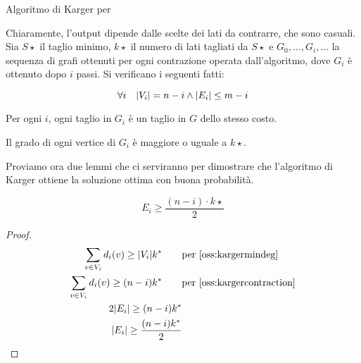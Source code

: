 \begin{algorithm}[ht]
	\caption{Algoritmo di Karger per \MinCut}
	\label{algo:Karger}

\end{algorithm}

Chiaramente, l'output dipende dalle scelte dei lati da contrarre, che sono casuali.
Sia $S\star$ il taglio minimo, $k\star$ il numero di lati tagliati da $S\star$ e $G_0,\dots,G_i,\dots$ la sequenza di grafi ottenuti per ogni contrazione operata dall'algoritmo, dove $G_i$ è ottenuto dopo $i$ passi. Si verificano i seguenti fatti:
\begin{oss}\label{oss:kargercontraction}
	\begin{equation*}
		\forall i \quad | V_i | = n-i \land | E_i | \leq m-i
	\end{equation*}
\end{oss}
\begin{oss}\label{oss:kargercuts}
	Per ogni $i$, ogni taglio in $G_i$ è un taglio in $G$ dello stesso costo.
\end{oss}
\begin{oss}\label{oss:kargermindeg}
	Il grado di ogni vertice di $G_i$ è maggiore o uguale a $k\star$.
\end{oss}

Proviamo ora due lemmi che ci serviranno per dimostrare che l'algoritmo di Karger ottiene la soluzione ottima con buona probabilità.
\begin{lemma}\label{lem:kargeredges}
	\begin{equation*}
		E_i \geq \frac{(n-i) \cdot k\star}{2}
	\end{equation*}
\end{lemma}
\begin{proof}
	\begin{align*}
		\sum_{v\in V_i} d_i(v) \geq \card{V_i} k\star \qquad & \text{per \cref{oss:kargermindeg}}      \\
		\sum_{v\in V_i} d_i(v) \geq (n-i) k\star  \qquad     & \text{per \cref{oss:kargercontraction}} \\
		2\card{E_i} \geq (n-i) k\star                                                                  \\
		\card{E_i} \geq \frac{(n-i) k\star}{2}                                                         \\
	\end{align*}
\end{proof}

